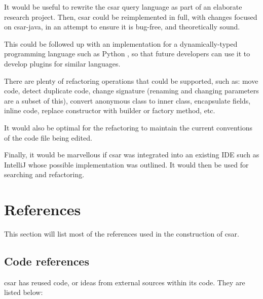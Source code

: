 \documentclass[12pt, letterpaper]{article}
\begin{document}
It would be useful to rewrite the csar query language as part of an elaborate research project.
Then, csar could be reimplemented in full, with changes focused on csar-java, in an attempt to ensure it is bug-free, and theoretically sound.

This could be followed up with an implementation for a dynamically-typed programming language such as Python \autocite{learningpython5thed}, so that future developers can use it to develop plugins for similar languages.

There are plenty of refactoring operations that could be supported, such as: move code, detect duplicate code, change signature (renaming and changing parameters are a subset of this), convert anonymous class to inner class, encapsulate fields, inline code, replace constructor with builder or factory method, etc. \autocite{intellijidearefactoring}

It would also be optimal for the refactoring to maintain the current conventions of the code file being edited.

Finally, it would be marvellous if csar was integrated into an existing IDE such as IntelliJ whose possible implementation was outlined.
It would then be used for searching and refactoring.

\section{References}
This section will list most of the references used in the construction of csar.

\subsection{Code references}
\label{sec:CodeReferences}
csar has reused code, or ideas from external sources within its code. They are listed below:
\end{document}
